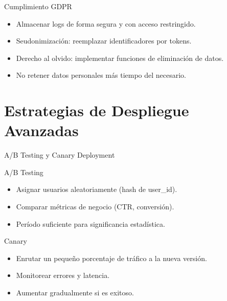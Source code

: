 \documentclass[aspectratio=169, 10pt, xcolor=table]{beamer}
\begin{document}
\begin{frame}{Cumplimiento GDPR}
    \begin{itemize}
        \item Almacenar logs de forma segura y con acceso restringido.
        \item Seudonimización: reemplazar identificadores por tokens.
        \item Derecho al olvido: implementar funciones de eliminación de datos.
        \item No retener datos personales más tiempo del necesario.
    \end{itemize}
\end{frame}

\section{Estrategias de Despliegue Avanzadas}

\begin{frame}{A/B Testing y Canary Deployment}
    \begin{block}{A/B Testing}
        \begin{itemize}
            \item Asignar usuarios aleatoriamente (hash de user\_id).
            \item Comparar métricas de negocio (CTR, conversión).
            \item Período suficiente para significancia estadística.
        \end{itemize}
    \end{block}
    \begin{block}{Canary}
        \begin{itemize}
            \item Enrutar un pequeño porcentaje de tráfico a la nueva versión.
            \item Monitorear errores y latencia.
            \item Aumentar gradualmente si es exitoso.
        \end{itemize}
    \end{block}
\end{frame}
\end{document}
